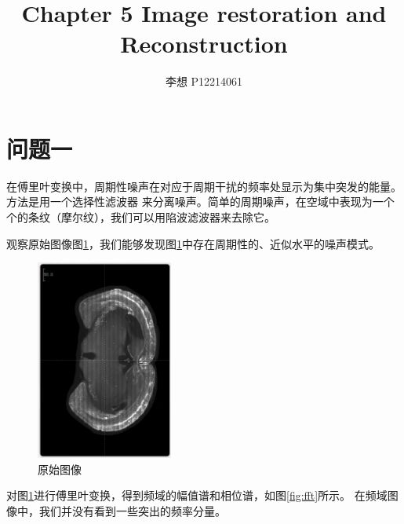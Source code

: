 \documentclass[UTF8]{article}
\title{Chapter 5 Image restoration and Reconstruction}
\author{李想 \quad P12214061}
\begin{document}
\maketitle
\section{问题一}
在傅里叶变换中，周期性噪声在对应于周期干扰的频率处显示为集中突发的能量。方法是用一个选择性滤波器
来分离噪声。简单的周期噪声，在空域中表现为一个个的条纹（摩尔纹），我们可以用陷波滤波器来去除它。

观察原始图像图\ref{fig:original_image}，我们能够发现图\ref{fig:original_image}中存在周期性的、近似水平的噪声模式。
\begin{figure}[htbp]
    \centering
    \includegraphics[width=0.4\textwidth,angle=90]{fMOST/fMOST鼠脑图1.png}
    \caption{原始图像}
    \label{fig:original_image}
\end{figure}
对图\ref{fig:original_image}进行傅里叶变换，得到频域的幅值谱和相位谱，如图\ref{fig:fft}所示。
在频域图像中，我们并没有看到一些突出的频率分量。
\end{document}
